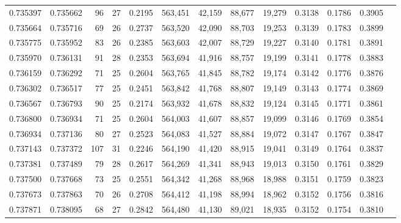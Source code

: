 \begin{tabular}{rrrrrrrrrrrrr}
0.735397 & 0.735662 &     96 &    27 &                                     0.2195 & 563,451 &  42,159 &  88,677 &  19,279 & 0.3138 & 0.1786 & 0.3905 \\
0.735664 & 0.735716 &     69 &    26 &                                     0.2737 & 563,520 &  42,090 &  88,703 &  19,253 & 0.3139 & 0.1783 & 0.3899 \\
0.735775 & 0.735952 &     83 &    26 &                                     0.2385 & 563,603 &  42,007 &  88,729 &  19,227 & 0.3140 & 0.1781 & 0.3891 \\
0.735970 & 0.736131 &     91 &    28 &                                     0.2353 & 563,694 &  41,916 &  88,757 &  19,199 & 0.3141 & 0.1778 & 0.3883 \\
0.736159 & 0.736292 &     71 &    25 &                                     0.2604 & 563,765 &  41,845 &  88,782 &  19,174 & 0.3142 & 0.1776 & 0.3876 \\
0.736302 & 0.736517 &     77 &    25 &                                     0.2451 & 563,842 &  41,768 &  88,807 &  19,149 & 0.3143 & 0.1774 & 0.3869 \\
0.736567 & 0.736793 &     90 &    25 &                                     0.2174 & 563,932 &  41,678 &  88,832 &  19,124 & 0.3145 & 0.1771 & 0.3861 \\
0.736800 & 0.736934 &     71 &    25 &                                     0.2604 & 564,003 &  41,607 &  88,857 &  19,099 & 0.3146 & 0.1769 & 0.3854 \\
0.736934 & 0.737136 &     80 &    27 &                                     0.2523 & 564,083 &  41,527 &  88,884 &  19,072 & 0.3147 & 0.1767 & 0.3847 \\
0.737143 & 0.737372 &    107 &    31 &                                     0.2246 & 564,190 &  41,420 &  88,915 &  19,041 & 0.3149 & 0.1764 & 0.3837 \\
0.737381 & 0.737489 &     79 &    28 &                                     0.2617 & 564,269 &  41,341 &  88,943 &  19,013 & 0.3150 & 0.1761 & 0.3829 \\
0.737500 & 0.737668 &     73 &    25 &                                     0.2551 & 564,342 &  41,268 &  88,968 &  18,988 & 0.3151 & 0.1759 & 0.3823 \\
0.737673 & 0.737863 &     70 &    26 &                                     0.2708 & 564,412 &  41,198 &  88,994 &  18,962 & 0.3152 & 0.1756 & 0.3816 \\
0.737871 & 0.738095 &     68 &    27 &                                     0.2842 & 564,480 &  41,130 &  89,021 &  18,935 & 0.3152 & 0.1754 & 0.3810 \\

\end{tabular}
